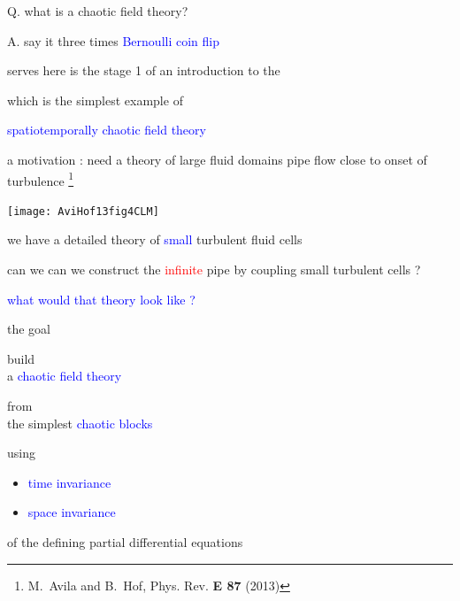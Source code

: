 \begin{frame}
  \titlepage
\end{frame}

\begin{frame}{Q. what is a chaotic field theory?}
    \begin{block}{A. say it three times}
{\textcolor{blue}{Bernoulli coin flip}}
\bigskip

\hfill serves here is the stage 1 of an introduction to the

{\textcolor{blue}{\catlatt}}
\bigskip

\hfill which is the simplest example of %

 \textcolor{blue}{spatiotemporally chaotic field theory}
\bigskip\bigskip\bigskip
    \end{block}
\end{frame} %


\begin{frame}{a motivation : need a theory of {\Huge large} fluid domains}
pipe flow close to onset of turbulence
\footnote{M.~Avila and B.~Hof, {Phys. Rev. \bf E 87} (2013)}
\begin{center}
\texttt{[image: AviHof13fig4CLM]}
\end{center}
we have a detailed theory of {\small \textcolor{blue}{small}} turbulent fluid cells

\bigskip

can we can we construct the \textcolor{red}{infinite} pipe by coupling small turbulent cells ?
\bigskip

\textcolor{blue}{what would that theory look like ?}
\end{frame} %


\begin{frame}{the goal}
\vfill

\begin{center}
{\Large build
\\
a \textcolor{blue}{chaotic field theory}
\medskip

from
\\
the simplest \textcolor{blue}{chaotic blocks}
}
\end{center}

\vfill
using
\begin{itemize}
  \item
\textcolor{blue}{time invariance}
  \item
\textcolor{blue}{space invariance}
\end{itemize}
 of the defining partial differential equations
\end{frame} %

